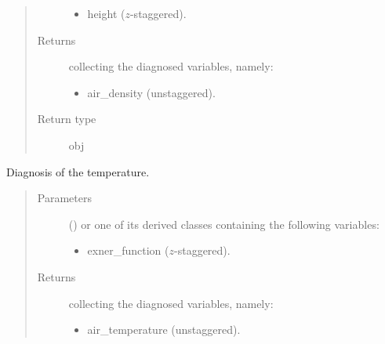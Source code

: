 \documentclass[letterpaper,10pt,english]{sphinxmanual}
\begin{document}
\begin{fulllineitems}
\begin{fulllineitems}
\begin{quote}
\begin{description}
\begin{itemize}
\item {} 
height (\(z\)-staggered).

\end{itemize}


\item[{Returns}] \leavevmode

{\hyperref[\detokenize{api:storages.grid_data.GridData}]{}} collecting the diagnosed variables, namely:
\begin{itemize}
\item {} 
air\_density (unstaggered).

\end{itemize}


\item[{Return type}] \leavevmode
obj

\end{description}\end{quote}

\end{fulllineitems}


\begin{fulllineitems}
\label{\detokenize{api:dycore.diagnostic_isentropic.DiagnosticIsentropic.get_air_temperature}}
Diagnosis of the temperature.
\begin{quote}\begin{description}
\item[{Parameters}] \leavevmode
{} () \textendash{} 
{\hyperref[\detokenize{api:storages.grid_data.GridData}]{}} or one of its derived classes containing the following variables:
\begin{itemize}
\item {} 
exner\_function (\(z\)-staggered).

\end{itemize}


\item[{Returns}] \leavevmode

{\hyperref[\detokenize{api:storages.grid_data.GridData}]{}} collecting the diagnosed variables, namely:
\begin{itemize}
\item {} 
air\_temperature (unstaggered).


\end{itemize}
\end{description}
\end{quote}
\end{fulllineitems}
\end{fulllineitems}
\end{document}

